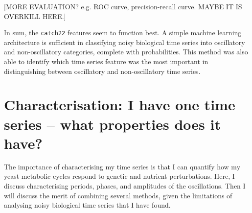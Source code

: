 [MORE EVALUATION? e.g. ROC curve, precision-recall curve.  MAYBE IT IS OVERKILL HERE.]

In sum,
the \texttt{catch22} features seem to function best.
A simple machine learning architecture is sufficient in classifying noisy biological time series into oscillatory and non-oscillatory categories, complete with probabilities.
This method was also able to identify which time series feature was the most important in distinguishing between oscillatory and non-oscillatory time series.

\section[Characterisation]{Characterisation: I have one time series -- what properties does it have?}
\label{sec:analysis-characterisation}

The importance of characterising my time series is that I can quantify how my yeast metabolic cycles respond to genetic and nutrient perturbations.
Here, I discuss characterising periods, phases, and amplitudes of the oscillations.
Then I will discuss the merit of combining several methods, given the limitations of analysing noisy biological time series that I have found.

